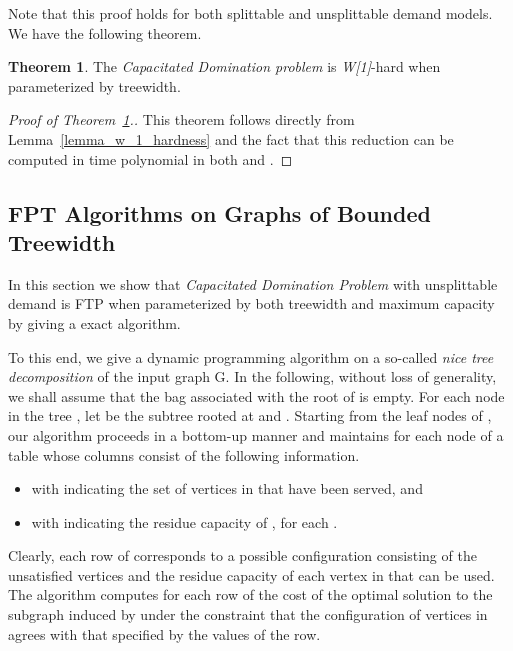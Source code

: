 \documentclass[a4paper,11pt]{article}
\theoremstyle{definition}
\newtheorem{theorem}{Theorem}
\begin{document}
Note that this proof holds for both splittable and unsplittable demand models. We have the following theorem.

\begin{theorem} \label{theorem_w_1_hardness}
The {\em Capacitated Domination problem} is {\it W[1]}-hard when parameterized by treewidth.
\end{theorem}

\begin{proof}[Proof of Theorem~\ref{theorem_w_1_hardness}.]
This theorem follows directly from Lemma~\ref{lemma_w_1_hardness} and the fact that this reduction can be computed in time polynomial in both  and .
\end{proof}




\subsection{FPT Algorithms on Graphs of Bounded Treewidth}

In this section we show that {\em Capacitated Domination Problem} with unsplittable demand is FTP when parameterized by both treewidth and maximum capacity by giving a  exact algorithm.

\smallskip

To this end, we give a dynamic programming algorithm on a so-called {\em nice tree decomposition} \cite{DBLP:books/sp/Kloks94} of the input graph G. In the following, without loss of generality, we shall assume that the bag associated with the root of  is empty. For each node  in the tree , let  be the subtree rooted at  and . Starting from the leaf nodes of , our algorithm proceeds in a bottom-up manner and maintains for each node  of  a table  whose columns consist of the following information.

\begin{itemize}
\item{ with  indicating the set of vertices in  that have been served, and}
\item{ with  indicating the residue capacity of , for each .}
\end{itemize}

Clearly, each row of  corresponds to a possible configuration consisting of the unsatisfied vertices and the residue capacity of each vertex in  that can be used. The algorithm computes for each row of  the cost of the optimal solution to the subgraph induced by  under the constraint that the configuration of vertices in  agrees with that specified by the values of the row.
\end{document}

